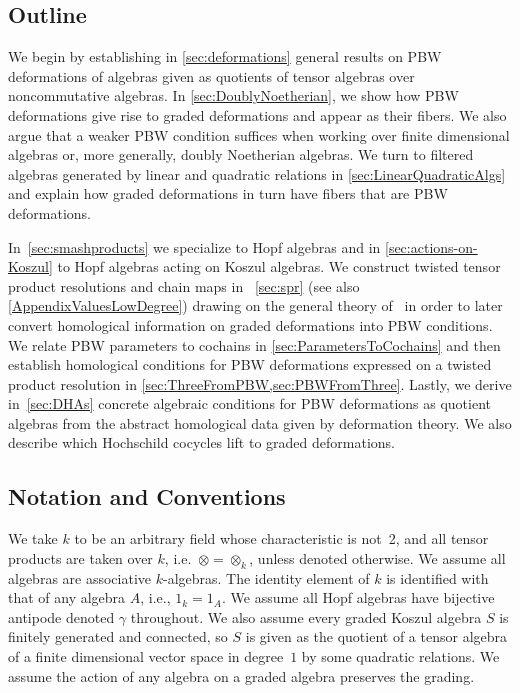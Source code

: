 \documentclass[11pt]{amsart}
\numberwithin{equation}{section}
\renewcommand{\_}[1]{\mbox{$_{\left( #1 \right)}$}}
\begin{document}
\subsection*{Outline}
We begin by establishing
in \cref{sec:deformations} general results on
PBW deformations of algebras given as quotients of tensor algebras over
noncommutative algebras.
In \cref{sec:DoublyNoetherian}, we show how PBW deformations give rise
to graded deformations and appear as their fibers.
We also argue that a weaker PBW condition suffices
when working over finite dimensional algebras or, more generally,  doubly Noetherian
algebras.
We turn to filtered algebras generated by linear and quadratic relations
in \cref{sec:LinearQuadraticAlgs} and explain how 
graded deformations in turn have fibers that are PBW deformations.

In~\cref{sec:smashproducts} we specialize
to Hopf algebras and in \cref{sec:actions-on-Koszul}
to Hopf algebras acting on Koszul algebras.
We construct
twisted tensor product resolutions and chain maps
in ~\cref{sec:spr} (see also \cref{AppendixValuesLowDegree})
drawing on the general theory of~\cite{TTP-AWEZ}
in order to later convert homological information on
graded deformations into PBW conditions.
We relate PBW parameters to cochains in
\cref{sec:ParametersToCochains}
and then establish
homological conditions for PBW deformations
expressed on a twisted product resolution
in \cref{sec:ThreeFromPBW,sec:PBWFromThree}.
Lastly,
we derive  in~\cref{sec:DHAs} concrete
algebraic conditions for PBW deformations
as quotient algebras from the abstract homological data
given by deformation theory.
We also describe which Hochschild cocycles lift to graded deformations.


\subsection*{Notation and Conventions}
We take $k$ to be an arbitrary field 
whose characteristic is not~2, and 
all tensor products are taken over $k$, i.e.~$\otimes=\otimes_k$,
unless denoted otherwise.
We assume all algebras are associative $k$-algebras.
The identity element of $k$
is identified with that of any algebra $A$, i.e., $1_k=1_A$.
We assume all Hopf algebras have bijective antipode denoted $\gamma$
throughout.
We also assume every graded Koszul algebra $S$
is
finitely generated and connected, 
so $S$ is given as the quotient of a tensor 
algebra of a finite dimensional vector space in degree~$1$
by some quadratic relations.
We assume the action of any algebra on a graded algebra
preserves the grading.
\end{document}
